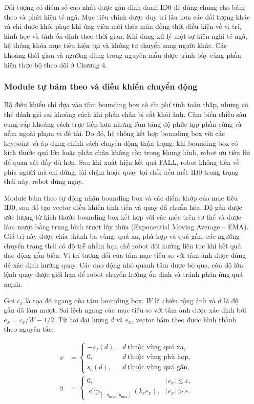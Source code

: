 Đối tượng có điểm số cao nhất được gán định danh ID0 để dùng chung cho bám theo và phát hiện té ngã. Mục tiêu chính được duy trì lâu hơn các đối tượng khác và chỉ được khôi phục khi ứng viên mới thỏa mãn đồng thời điều kiện về vị trí, hình học và tính ổn định theo thời gian. Khi đang xử lý một sự kiện nghi té ngã, hệ thống khóa mục tiêu hiện tại và không tự chuyển sang người khác. Các khoảng thời gian và ngưỡng dùng trong nguyên mẫu được trình bày cùng phần hiện thực bộ theo dõi ở Chương 4.

\subsubsection{Module tự bám theo và điều khiển chuyển động}
Bộ điều khiển chỉ dựa vào tâm bounding box có chi phí tính toán thấp, nhưng có thể đánh giá sai khoảng cách khi phần chân bị cắt khỏi ảnh. Cảm biến chiều sâu cung cấp khoảng cách trực tiếp hơn nhưng làm tăng độ phức tạp phần cứng và nằm ngoài phạm vi đề tài. Do đó, hệ thống kết hợp bounding box với các keypoint và áp dụng chính sách chuyển động thận trọng: khi bounding box có kích thước quá lớn hoặc phần chân không còn trong khung hình, robot ưu tiên lùi để quan sát đầy đủ hơn. Sau khi xuất hiện kết quả FALL, robot không tiến về phía người mà chỉ dừng, lùi chậm hoặc quay tại chỗ; nếu mất ID0 trong trạng thái này, robot dừng ngay.

Module bám theo tự động nhận bounding box và các điểm khớp của mục tiêu ID0, sau đó tạo vector điều khiển tịnh tiến và quay đã chuẩn hóa. Độ gần được ước lượng từ kích thước bounding box kết hợp với các mốc trên cơ thể và được làm mượt bằng trung bình trượt lũy thừa (Exponential Moving Average -- EMA). Giá trị này được chia thành ba vùng: quá xa, phù hợp và quá gần; các ngưỡng chuyển trạng thái có độ trễ nhằm hạn chế robot đổi hướng liên tục khi kết quả dao động gần biên. Vị trí tương đối của tâm mục tiêu so với tâm ảnh được dùng để xác định hướng quay. Các dao động nhỏ quanh tâm được bỏ qua, còn độ lớn lệnh quay được giới hạn để robot chuyển hướng ổn định và tránh phản ứng quá mạnh.

Gọi $c_x$ là tọa độ ngang của tâm bounding box, $W$ là chiều rộng ảnh và $d$ là độ gần đã làm mượt. Sai lệch ngang của mục tiêu so với tâm ảnh được xác định bởi $e_x=c_x/W-1/2$. Từ hai đại lượng $d$ và $e_x$, vector bám theo được hình thành theo nguyên tắc:

\begin{equation}
\begin{aligned}
x&=\begin{cases}
-s_f(d), & d\ \text{thuộc vùng quá xa},\\
0,       & d\ \text{thuộc vùng phù hợp},\\
s_b(d), & d\ \text{thuộc vùng quá gần},
\end{cases}\\
y&=\begin{cases}
0, & |e_x|\leq \varepsilon,\\
\operatorname{clip}_{[-y_{\max};\,y_{\max}]}(k_e e_x), & |e_x|>\varepsilon.
\end{cases}
\end{aligned}
\label{eq:auto_follow_vector_design}
\end{equation}

